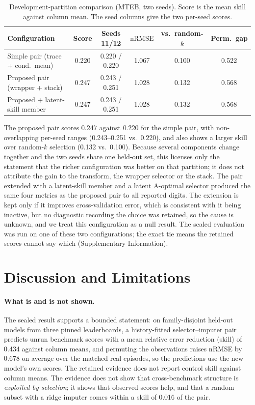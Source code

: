 \documentclass{article}
\newcommand{\nrmse}{\mathrm{nRMSE}}
\begin{document}
\begin{table}[t]
\centering
\caption{Development-partition comparison (MTEB, two seeds). Score is the mean skill against column mean. The seed columns give the two per-seed scores.}
\label{tab:search}
\small
\begin{tabular}{lccccc}
\toprule
Configuration & Score & Seeds 11/12 & $\nrmse$ & vs.\ random-$k$ & Perm.\ gap\\
\midrule
Simple pair (trace + cond.\ mean) & 0.220 & 0.220 / 0.220 & 1.067 & 0.100 & 0.522\\
Proposed pair (wrapper + stack) & 0.247 & 0.243 / 0.251 & 1.028 & 0.132 & 0.568\\
Proposed + latent-skill member & 0.247 & 0.243 / 0.251 & 1.028 & 0.132 & 0.568\\
\bottomrule
\end{tabular}
\end{table}

The proposed pair scores 0.247 against 0.220 for the simple pair, with non-overlapping per-seed ranges (0.243--0.251 vs.\ 0.220), and also shows a larger skill over random-$k$ selection (0.132 vs.\ 0.100). %
Because several components change together and the two seeds share one held-out set, this licenses only the statement that the richer configuration was better on that partition; it does not attribute the gain to the transform, the wrapper selector or the stack. The pair extended with a latent-skill member and a latent A-optimal selector produced the same four metrics as the proposed pair to all reported digits. The extension is kept only if it improves cross-validation error, which is consistent with it being inactive, but no diagnostic recording the choice was retained, so the cause is unknown, and we treat this configuration as a null result. The sealed evaluation was run on one of these two configurations; the exact tie means the retained scores cannot say which (Supplementary Information).

\section{Discussion and Limitations}\label{sec:limits}
\paragraph{What is and is not shown.} The sealed result supports a bounded statement: on family-disjoint held-out models from three pinned leaderboards, a history-fitted selector--imputer pair predicts unrun benchmark scores with a mean relative error reduction (skill) of 0.434 against column means, and permuting the observations raises nRMSE by 0.678 on average over the matched real episodes, so the predictions use the new model's own scores. The retained evidence does not report control skill against column means. The evidence does not show that cross-benchmark structure is \emph{exploited by selection}; it shows that observed scores help, and that a random subset with a ridge imputer comes within a skill of 0.016 of the pair.
\end{document}
